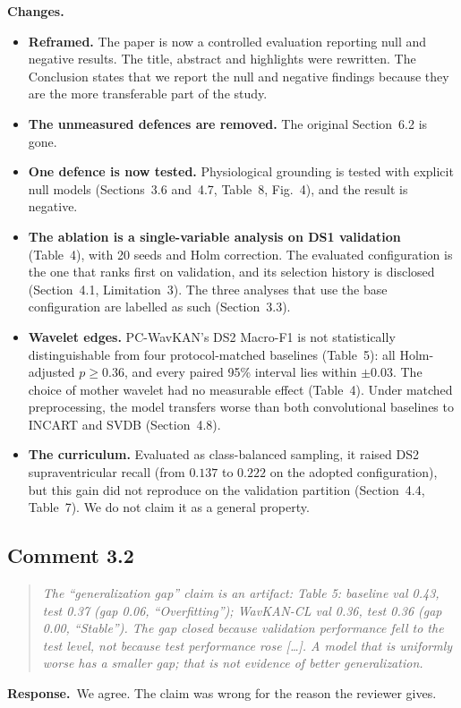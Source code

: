 \documentclass[11pt]{article}
\newenvironment{reviewer}{\begin{quote}\itshape\color{revcol}}{\end{quote}}
\newcommand{\resp}{\textbf{Response.}~}
\newcommand{\chg}{\textbf{Changes.}~}
\begin{document}
\chg
\begin{itemize}[leftmargin=1.2em,itemsep=2pt]
\item \textbf{Reframed.} The paper is now a controlled evaluation reporting null and negative results. The title, abstract and highlights were rewritten. The Conclusion states that we report the null and negative findings because they are the more transferable part of the study.
\item \textbf{The unmeasured defences are removed.} The original Section~6.2 is gone.
\item \textbf{One defence is now tested.} Physiological grounding is tested with explicit null models (Sections~3.6 and~4.7, Table~8, Fig.~4), and the result is negative.
\item \textbf{The ablation is a single-variable analysis on DS1 validation} (Table~4), with 20 seeds and Holm correction. The evaluated configuration is the one that ranks first on validation, and its selection history is disclosed (Section~4.1, Limitation~3). The three analyses that use the base configuration are labelled as such (Section~3.3).
\item \textbf{Wavelet edges.} PC-WavKAN's DS2 Macro-F1 is not statistically distinguishable from four protocol-matched baselines (Table~5): all Holm-adjusted $p\geq0.36$, and every paired 95\% interval lies within $\pm0.03$. The choice of mother wavelet had no measurable effect (Table~4). Under matched preprocessing, the model transfers worse than both convolutional baselines to INCART and SVDB (Section~4.8).
\item \textbf{The curriculum.} Evaluated as class-balanced sampling, it raised DS2 supraventricular recall (from $0.137$ to $0.222$ on the adopted configuration), but this gain did not reproduce on the validation partition (Section~4.4, Table~7). We do not claim it as a general property.
\end{itemize}

\subsection*{Comment 3.2}
\begin{reviewer}
The ``generalization gap'' claim is an artifact: Table 5: baseline val 0.43, test 0.37 (gap 0.06, ``Overfitting''); WavKAN-CL val 0.36, test 0.36 (gap 0.00, ``Stable''). The gap closed because validation performance fell to the test level, not because test performance rose [\ldots]. A model that is uniformly worse has a smaller gap; that is not evidence of better generalization.
\end{reviewer}
\resp We agree. The claim was wrong for the reason the reviewer gives.
\end{document}

